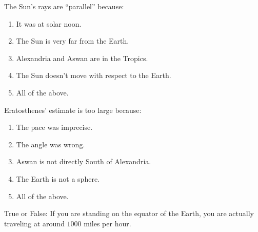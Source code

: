 \documentclass[noauthor,nooutcomes]{ximera}
\author{Bart Snapp and Claire Merriman}
\begin{document}
\maketitle


\begin{exercise}
  The Sun's rays are ``parallel'' because:
  \begin{enumerate}
  \item It was at solar noon.
  \item The Sun is very far from the Earth.
  \item Alexandria and Aswan are in the Tropics.
  \item The Sun doesn't move with respect to the Earth.
  \item All of the above.
  \end{enumerate}
\end{exercise}

\begin{exercise}
  Eratosthenes' estimate is too large because:
  \begin{enumerate}
  \item The pace was imprecise.
  \item The angle was wrong.
  \item Aswan is not directly South of Alexandria. 
  \item The Earth is not a sphere.
  \item All of the above.
  \end{enumerate}
\end{exercise}




\begin{exercise}
  True or False: If you are standing on the equator of the Earth, you are actually traveling at around $1000$ miles per hour.
\end{exercise}
\end{document}
